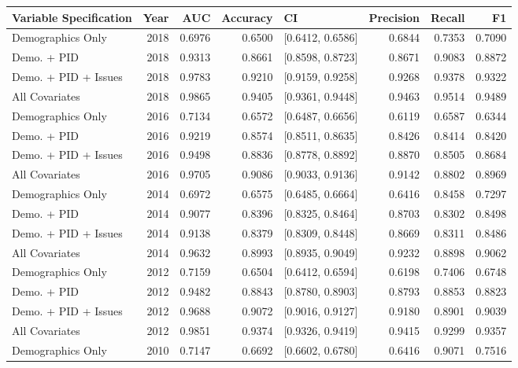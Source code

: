 \begin{table}[ht]
\centering
\begin{tabular}{lrrrlrrr}
  \toprule
Variable Specification & Year & AUC & Accuracy & CI & Precision & Recall & F1 \\ 
  \midrule
Demographics Only & 2018 & 0.6976 & 0.6500 & [0.6412, 0.6586] & 0.6844 & 0.7353 & 0.7090 \\ 
  Demo. + PID & 2018 & 0.9313 & 0.8661 & [0.8598, 0.8723] & 0.8671 & 0.9083 & 0.8872 \\ 
  Demo. + PID + Issues & 2018 & 0.9783 & 0.9210 & [0.9159, 0.9258] & 0.9268 & 0.9378 & 0.9322 \\ 
  All Covariates & 2018 & 0.9865 & 0.9405 & [0.9361, 0.9448] & 0.9463 & 0.9514 & 0.9489 \\ 
  Demographics Only & 2016 & 0.7134 & 0.6572 & [0.6487, 0.6656] & 0.6119 & 0.6587 & 0.6344 \\ 
  Demo. + PID & 2016 & 0.9219 & 0.8574 & [0.8511, 0.8635] & 0.8426 & 0.8414 & 0.8420 \\ 
  Demo. + PID + Issues & 2016 & 0.9498 & 0.8836 & [0.8778, 0.8892] & 0.8870 & 0.8505 & 0.8684 \\ 
  All Covariates & 2016 & 0.9705 & 0.9086 & [0.9033, 0.9136] & 0.9142 & 0.8802 & 0.8969 \\ 
  Demographics Only & 2014 & 0.6972 & 0.6575 & [0.6485, 0.6664] & 0.6416 & 0.8458 & 0.7297 \\ 
  Demo. + PID & 2014 & 0.9077 & 0.8396 & [0.8325, 0.8464] & 0.8703 & 0.8302 & 0.8498 \\ 
  Demo. + PID + Issues & 2014 & 0.9138 & 0.8379 & [0.8309, 0.8448] & 0.8669 & 0.8311 & 0.8486 \\ 
  All Covariates & 2014 & 0.9632 & 0.8993 & [0.8935, 0.9049] & 0.9232 & 0.8898 & 0.9062 \\ 
  Demographics Only & 2012 & 0.7159 & 0.6504 & [0.6412, 0.6594] & 0.6198 & 0.7406 & 0.6748 \\ 
  Demo. + PID & 2012 & 0.9482 & 0.8843 & [0.8780, 0.8903] & 0.8793 & 0.8853 & 0.8823 \\ 
  Demo. + PID + Issues & 2012 & 0.9688 & 0.9072 & [0.9016, 0.9127] & 0.9180 & 0.8901 & 0.9039 \\ 
  All Covariates & 2012 & 0.9851 & 0.9374 & [0.9326, 0.9419] & 0.9415 & 0.9299 & 0.9357 \\ 
  Demographics Only & 2010 & 0.7147 & 0.6692 & [0.6602, 0.6780] & 0.6416 & 0.9071 & 0.7516 \\ 

\end{tabular}
\end{table}
